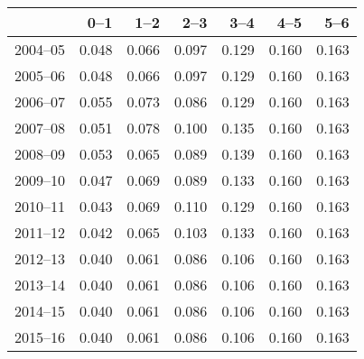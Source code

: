 \begin{table}[ht]
\centering
\begin{tabular}{rrrrrrr}
  \hline
 & 0--1 & 1--2 & 2--3 & 3--4 & 4--5 & 5--6 \\ 
  \hline
2004--05 & 0.048 & 0.066 & 0.097 & 0.129 & 0.160 & 0.163 \\ 
  2005--06 & 0.048 & 0.066 & 0.097 & 0.129 & 0.160 & 0.163 \\ 
  2006--07 & 0.055 & 0.073 & 0.086 & 0.129 & 0.160 & 0.163 \\ 
  2007--08 & 0.051 & 0.078 & 0.100 & 0.135 & 0.160 & 0.163 \\ 
  2008--09 & 0.053 & 0.065 & 0.089 & 0.139 & 0.160 & 0.163 \\ 
  2009--10 & 0.047 & 0.069 & 0.089 & 0.133 & 0.160 & 0.163 \\ 
  2010--11 & 0.043 & 0.069 & 0.110 & 0.129 & 0.160 & 0.163 \\ 
  2011--12 & 0.042 & 0.065 & 0.103 & 0.133 & 0.160 & 0.163 \\ 
  2012--13 & 0.040 & 0.061 & 0.086 & 0.106 & 0.160 & 0.163 \\ 
  2013--14 & 0.040 & 0.061 & 0.086 & 0.106 & 0.160 & 0.163 \\ 
  2014--15 & 0.040 & 0.061 & 0.086 & 0.106 & 0.160 & 0.163 \\ 
  2015--16 & 0.040 & 0.061 & 0.086 & 0.106 & 0.160 & 0.163 \\ 
   \hline
\end{tabular}
\end{table}
